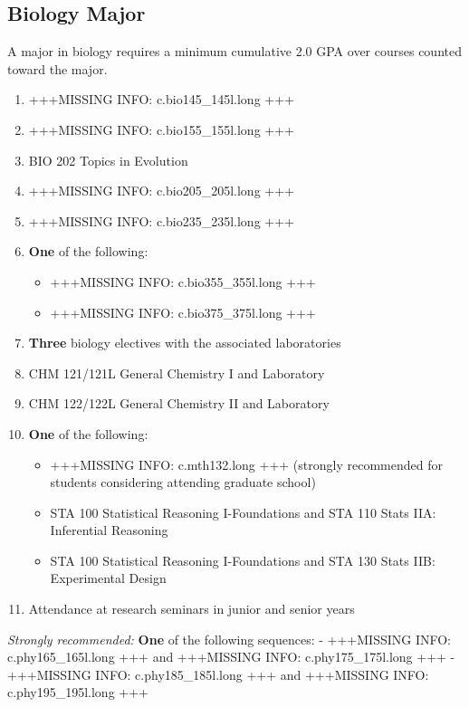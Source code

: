 \documentclass[
  letterpaper,
]{scrbook}
\providecommand{\tightlist}{%
  \setlength{\itemsep}{0pt}\setlength{\parskip}{0pt}}
\begin{document}
\subsection{Biology Major}\label{biology-major}

A major in biology requires a minimum cumulative 2.0 GPA over courses
counted toward the major.

\begin{enumerate}
\def\labelenumi{\arabic{enumi}.}
\tightlist
\item
  +++MISSING INFO: c.bio145\_145l.long +++
\item
  +++MISSING INFO: c.bio155\_155l.long +++
\item
  BIO 202 Topics in Evolution
\item
  +++MISSING INFO: c.bio205\_205l.long +++
\item
  +++MISSING INFO: c.bio235\_235l.long +++
\item
  \textbf{One} of the following:

  \begin{itemize}
  \tightlist
  \item
    +++MISSING INFO: c.bio355\_355l.long +++
  \item
    +++MISSING INFO: c.bio375\_375l.long +++
  \end{itemize}
\item
  \textbf{Three} biology electives with the associated laboratories
\item
  CHM 121/121L General Chemistry I and Laboratory
\item
  CHM 122/122L General Chemistry II and Laboratory
\item
  \textbf{One} of the following:

  \begin{itemize}
  \tightlist
  \item
    +++MISSING INFO: c.mth132.long +++ (strongly recommended for
    students considering attending graduate school)
  \item
    STA 100 Statistical Reasoning I-Foundations and STA 110 Stats IIA:
    Inferential Reasoning
  \item
    STA 100 Statistical Reasoning I-Foundations and STA 130 Stats IIB:
    Experimental Design
  \end{itemize}
\item
  Attendance at research seminars in junior and senior years
\end{enumerate}

\emph{Strongly recommended:} \textbf{One} of the following sequences: -
+++MISSING INFO: c.phy165\_165l.long +++ and +++MISSING INFO:
c.phy175\_175l.long +++ - +++MISSING INFO: c.phy185\_185l.long +++ and
+++MISSING INFO: c.phy195\_195l.long +++
\end{document}
